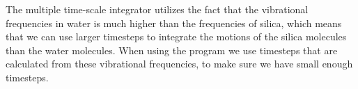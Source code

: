 The multiple time-scale integrator utilizes the fact that the vibrational frequencies in water is much higher than the frequencies of silica, which means that we can use larger timesteps to integrate the motions of the silica molecules than the water molecules. When using the program we use timesteps that are calculated from these vibrational frequencies, to make sure we have small enough timesteps.

